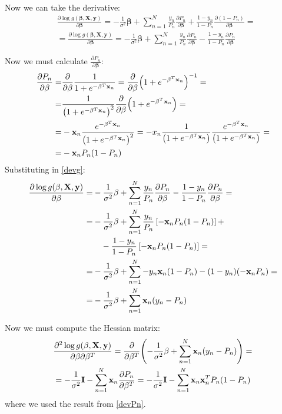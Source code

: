 \documentclass[12pt, letterpaper]{article}
\theoremstyle{definition}
\newcommand{\X}{\mathrm{\mathbf{X}}}
\newcommand{\I}{\mathrm{\mathbf{I}}}
\newcommand{\y}{\mathbf{y}}
\newcommand{\be}{\mathbf{\beta}}
\newcommand{\x}{\mathbf{x}}
\DeclarePairedDelimiter\autobracket{(}{)}
\newcommand{\br}[1]{\autobracket*{#1}}
\begin{document}
Now we can take the derivative:
\begin{equation}
\label{devg}
\begin{aligned}
&\frac{\partial \log g(\be,\X,\y)}{\partial \be} = - \frac{1}{\sigma^2} \be + \sum_{n=1}^N \frac{y_n}{P_n}\frac{\partial P_n}{\partial \be} + \frac{1-y_n}{1-P_n}\frac{\partial (1-P_n)}{\partial \be} =\\
&=\frac{\partial \log g(\be,\X,\y)}{\partial \be} = - \frac{1}{\sigma^2} \be + \sum_{n=1}^N \frac{y_n}{P_n}\frac{\partial P_n}{\partial \be} - \frac{1-y_n}{1-P_n}\frac{\partial P_n}{\partial \be}
\end{aligned}
\end{equation}

Now we must calculate $\frac{\partial P_n}{\partial \be}$:
\begin{equation}
\label{devPn}
\begin{aligned}
\frac{\partial P_n}{\partial \be} =& \frac{\partial}{\partial \be} \frac{1}{1+e^{-\be^T\x_n}} = \frac{\partial}{\partial \be} \br{1+e^{-\be^T\x_n}}^{-1} =\\
=& \frac{1}{\br{1+e^{-\be^T\x_n}}^2}  \frac{\partial}{\partial \be} \br{1+e^{-\be^T\x_n}} = \\
=&  -\x_n \frac{e^{-\be^T\x_n}}{\br{1+e^{-\be^T\x_n}}^2}   = -x_n \frac{1}{\br{1+e^{-\be^T\x_n}}}\frac{e^{-\be^T\x_n}}{\br{1+e^{-\be^T\x_n}}} =\\
=& -\x_nP_n \br{1-P_n}
\end{aligned}
\end{equation}
Substituting in \autoref{devg}:
\begin{equation}
\begin{aligned}
\frac{\partial \log g(\be,\X,\y)}{\partial \be} =&  - \frac{1}{\sigma^2} \be + \sum_{n=1}^N \frac{y_n}{P_n}\frac{\partial P_n}{\partial \be} - \frac{1-y_n}{1-P_n}\frac{\partial P_n}{\partial \be} =\\
=&- \frac{1}{\sigma^2} \be + \sum_{n=1}^N \frac{y_n}{P_n}\left[-\x_nP_n \br{1-P_n}\right]+ \\
&\quad  - \frac{1-y_n}{1-P_n}\left[-\x_nP_n \br{1-P_n}\right] =\\
=& - \frac{1}{\sigma^2} \be + \sum_{n=1}^N -y_n\x_n \br{1-P_n} - (1-y_n)(-\x_nP_n ) = \\
=& - \frac{1}{\sigma^2} \be + \sum_{n=1}^N \x_n (y_n-P_n)
\end{aligned}
\end{equation}

Now we must compute the Hessian matrix:
\begin{equation}
\begin{aligned}
&\frac{\partial^2 \log g(\be,\X,\y)}{\partial \be \partial\be^T}  = \frac{\partial}{\partial \be^T} \br{- \frac{1}{\sigma^2} \be + \sum_{n=1}^N \x_n (y_n-P_n)} =
\\ &=- \frac{1}{\sigma^2} \I -\sum_{n=1}^N \x_n \frac{\partial P_n}{\partial \be^T} = - \frac{1}{\sigma^2} \I - \sum_{n=1}^N \x_n \x_n^TP_n \br{1-P_n}
\end{aligned}
\end{equation}
where we used the result from \autoref{devPn}.
\end{document}

